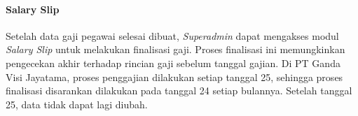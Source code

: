 \paragraph{Salary Slip}
Setelah data gaji pegawai selesai dibuat, \textit{Superadmin} dapat mengakses modul \textit{Salary Slip} untuk melakukan finalisasi gaji. Proses finalisasi ini memungkinkan pengecekan akhir terhadap rincian gaji sebelum tanggal gajian. Di PT Ganda Visi Jayatama, proses penggajian dilakukan setiap tanggal 25, sehingga proses finalisasi disarankan dilakukan pada tanggal 24 setiap bulannya. Setelah tanggal 25, data tidak dapat lagi diubah.
\begin{figure}[H]
    \centering

\end{figure}
